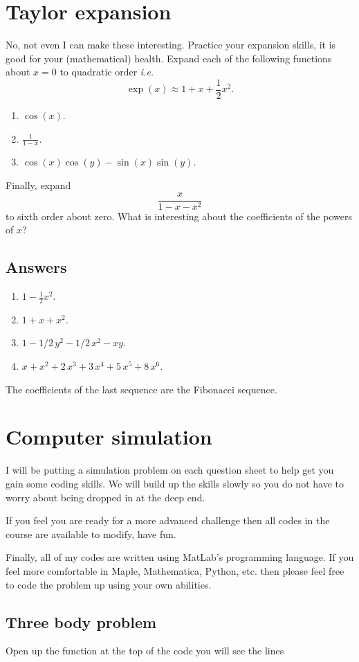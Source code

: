 \documentclass[10pt]{article}
\newcommand{\bb}{\begin{equation}}
\newcommand{\ee}{\end{equation}}
\newcommand{\ie}{\emph{i.e.} }
\begin{document}
\section{Taylor expansion}
No, not even I can make these interesting. Practice your expansion skills, it is good for your (mathematical) health. Expand each of the following functions about $x=0$ to quadratic order \ie
\bb
\exp(x)\approx 1+x+\frac{1}{2}x^2.
\ee
\begin{enumerate}
\item $\cos(x)$.
\item $\frac{1}{1-x}$.
\item $\cos(x)\cos(y)-\sin(x)\sin(y)$.
\end{enumerate}
Finally, expand
\bb
\frac{x}{1-x-x^2}
\ee
to sixth order about zero. What is interesting about the coefficients of the powers of $x$?
\begin{Answ}
\subsection{Answers}
\begin{enumerate}
\item $1-{\frac {1}{2}}{x}^{2}$.
\item $1+x+{x}^{2}$.
\item $1-1/2\,{y}^{2}-1/2\,{x}^{2}-xy$.
\item $x+{x}^{2}+2\,{x}^{3}+3\,{x}^{4}+5\,{x}^{5}+8\,{x}^{6}$.
\end{enumerate}
The coefficients of the last sequence are the Fibonacci sequence.
\end{Answ}
\section{Computer simulation}
I will be putting a simulation problem on each question sheet to help get you gain some coding skills. We will build up the skills slowly so you do not have to worry about being dropped in at the deep end.

If you feel you are ready for a more advanced challenge then all codes in the course are available to modify, have fun.

Finally, all of my codes are written using MatLab's programming language. If you feel more comfortable in Maple, Mathematica, Python, etc. then please feel free to code the problem up using your own abilities.
\subsection*{Three body problem}
Open up the function  at the top of the code you will see the lines
\end{document}

